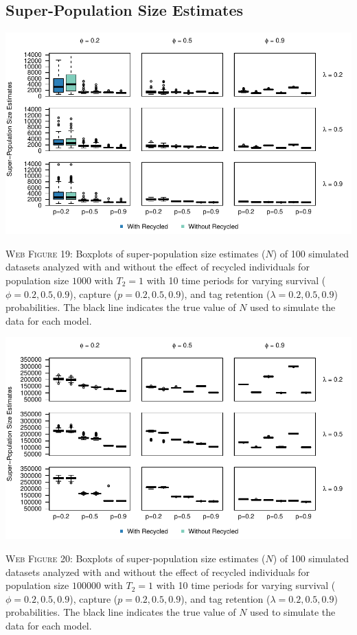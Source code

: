 \documentclass[]{article}
\begin{document}
\newpage

\subsection{Super-Population Size
Estimates}\label{super-population-size-estimates}

\includegraphics{Appendix_files/figure-latex/19_superN_GJSTL1-1.pdf}

\textsc{Web Figure 19:} Boxplots of super-population size estimates
(\(N\)) of 100 simulated datasets analyzed with and without the effect
of recycled individuals for population size \(1000\) with \(T_2=1\) with
10 time periods for varying survival (\(\phi=0.2,0.5,0.9\)), capture
(\(p=0.2,0.5,0.9\)), and tag retention (\(\lambda=0.2,0.5,0.9\))
probabilities. The black line indicates the true value of \(N\) used to
simulate the data for each model.

\includegraphics{Appendix_files/figure-latex/20_superN_GJSTL2-1.pdf}

\textsc{Web Figure 20:} Boxplots of super-population size estimates
(\(N\)) of 100 simulated datasets analyzed with and without the effect
of recycled individuals for population size \(100000\) with \(T_2=1\)
with 10 time periods for varying survival (\(\phi=0.2,0.5,0.9\)),
capture (\(p=0.2,0.5,0.9\)), and tag retention (\(\lambda=0.2,0.5,0.9\))
probabilities. The black line indicates the true value of \(N\) used to
simulate the data for each model.
\end{document}
